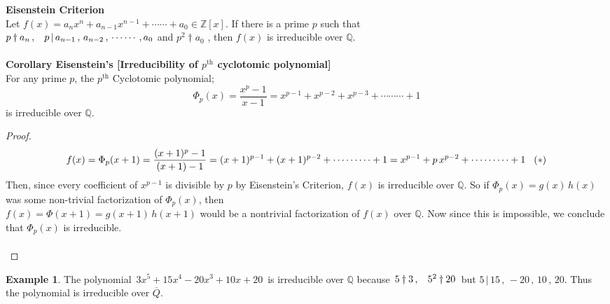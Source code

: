 \documentclass[11pt,a4paper]{article}
\theoremstyle{definition}
\newtheorem{exa}[thm]{Example}
\begin{document}
\textbf{Eisenstein Criterion}\\
Let $f(x) = a_n x^n + a_{n-1} x^{n-1}  + \cdots\cdots + a_0 \in \mathbb{Z}[x]$. If there is a prime $p$ such that\\ $p \dagger a_n\, , \hspace{0.3cm} p\, |\, a_{n - 1}\, , \, a_{n-2}\, , \, \cdots\cdots, a_0$ and $p^2\dagger a_0$ , then $f(x)$ is irreducible over $\mathbb{Q}$.\\\\





\textbf{Corollary Eisenstein's [Irreducibility of $p^{\text{th}}$ cyclotomic polynomial]}\\
For any prime $p$, the $p^{\text{th}}$  Cyclotomic polynomial; $$ \Phi_p(x) = \frac{x^p - 1}{x - 1} = x^{p - 1} + x^{p - 2} + x^{p - 3} + \cdots\cdots\cdots + 1$$ is irreducible over $\mathbb{Q}$.\\


\begin{proof}
$$f(x) = \Phi_p(x + 1) = \dfrac{(x + 1)^p - 1}{(x + 1) - 1} = (x + 1)^{p - 1} + (x + 1)^{p -2} + \cdots\cdots\cdots + 1 = x^{p-1} + p\, x^{p-2} + \cdots\cdots\cdots + 1\hspace{0.3cm} (*)$$
Then, since every coefficient of $x^{p - 1}$ is divisible by $p$ by Eisenstein's Criterion, $f(x)$ is irreducible over $\mathbb{Q}$. So if $\Phi_p(x) = g(x)\, h(x)$ was some non-trivial factorization of $\Phi_p(x)$, then\\ $f(x) = \Phi(x + 1) = g(x + 1)\, h(x + 1)$ would be a nontrivial factorization of $f(x)$ over $\mathbb{Q}$.
Now since this is impossible, we conclude that $\Phi_p(x)$ is irreducible.\\\\
\end{proof}





\begin{exa}
The polynomial $\, 3x^5 + 15x^4 - 20x^3 + 10x + 20\, $ is irreducible over $\mathbb{Q}$ because $\, 5\dagger 3\, , \hspace{0.3cm} 5^2\dagger 20\,$ but $5\, |\, 15\, , \, -20\, , \, 10\, , \, 20$. Thus the polynomial is irreducible over $\overline{Q}$.\\\\
\end{exa}
\end{document}
